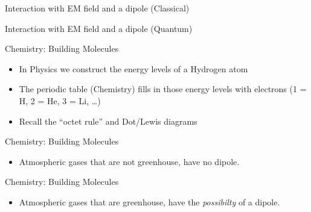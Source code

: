 \documentclass[12pt]{beamer}
\begin{document}
\begin{frame}{Interaction with EM field and a dipole (Classical)}


\vspace{7cm}


\end{frame}
\begin{frame}{Interaction with EM field and a dipole (Quantum)}

\vspace{7cm}

\end{frame}
\begin{frame}{Chemistry: Building Molecules}

\begin{itemize}
\item In Physics we construct the energy levels of a Hydrogen atom
\item The periodic table (Chemistry) fills in those energy levels with electrons (1 = H, 2 = He, 3 = Li, \ldots)
\item Recall the ``octet rule'' and Dot/Lewis diagrams
\end{itemize}

\vspace{7cm}

\end{frame}
\begin{frame}{Chemistry: Building Molecules}

\begin{itemize}
\item Atmospheric gases that are not greenhouse, have no dipole.
\end{itemize}

\vspace{7cm}


\end{frame}
\begin{frame}{Chemistry: Building Molecules}

\begin{itemize}
\item Atmospheric gases that are greenhouse, have the {\em possibilty} of a dipole.
\end{itemize}

\vspace{7cm}

\end{frame}
\end{document}
